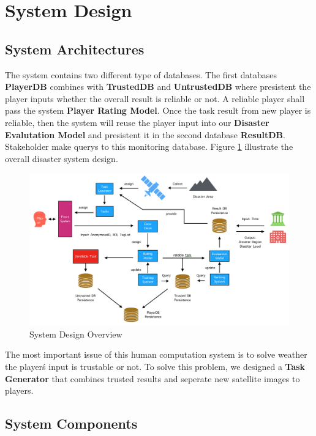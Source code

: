 \section{System Design}

\subsection{System Architectures}

  The system contains two different type of databases. The first databases \textbf{PlayerDB}
  combines with \textbf{TrustedDB} and \textbf{UntrustedDB} where
  presistent the player inputs whether the overall result is reliable or not. 
  A reliable player shall pass the system \textbf{Player Rating Model}. 
  Once the task result from new player is reliable, then the system will
  reuse the player input into our \textbf{Disaster Evalutation Model} and presistent it in the second
  database \textbf{ResultDB}. Stakeholder make querys to this monitoring database. 
  Figure \ref{fig:arch} illustrate the overall disaster system design.

    \begin{figure}[htp]
    \centering
    \includegraphics[width=\textwidth]{figures/system2}
    \caption{System Design Overview}
    \label{fig:arch}
    \end{figure}

  The most important issue of this human computation system is to solve weather the player\'s input
  is trustable or not. To solve this problem, we designed a \textbf{Task Generator} that combines 
  trusted results and seperate new satellite images to players. 

\subsection{System Components}

